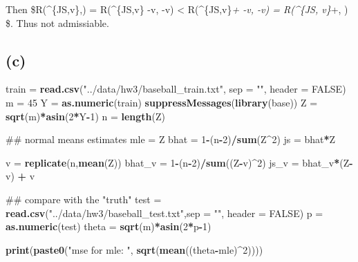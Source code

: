 \documentclass[]{article}
\newenvironment{Shaded}{\begin{snugshade}}{\end{snugshade}}
\newcommand{\KeywordTok}[1]{\textcolor[rgb]{0.13,0.29,0.53}{\textbf{#1}}}
\newcommand{\DataTypeTok}[1]{\textcolor[rgb]{0.13,0.29,0.53}{#1}}
\newcommand{\DecValTok}[1]{\textcolor[rgb]{0.00,0.00,0.81}{#1}}
\newcommand{\StringTok}[1]{\textcolor[rgb]{0.31,0.60,0.02}{#1}}
\newcommand{\OtherTok}[1]{\textcolor[rgb]{0.56,0.35,0.01}{#1}}
\newcommand{\OperatorTok}[1]{\textcolor[rgb]{0.81,0.36,0.00}{\textbf{#1}}}
\newcommand{\NormalTok}[1]{#1}
\begin{document}
Then \$R(\widehat{\theta}\^{}\{JS,v\},\theta) =
R(\widehat{\theta}\^{}\{JS,v\} -v, \theta-v) \textless{}
R(\widehat{\theta}\^{}\{JS,v\}\emph{+ -v, \theta-v) =
R(\widehat{\theta}\^{}\{JS, v\}}+, \theta) \$. Thus not admissiable.

\subsection{(c)}\label{c-1}

\begin{Shaded}
\begin{Highlighting}[]
\NormalTok{train =}\StringTok{ }\KeywordTok{read.csv}\NormalTok{(}\StringTok{"../data/hw3/baseball_train.txt"}\NormalTok{, }\DataTypeTok{sep =} \StringTok{""}\NormalTok{, }\DataTypeTok{header =} \OtherTok{FALSE}\NormalTok{)}
\NormalTok{m =}\StringTok{ }\DecValTok{45}
\NormalTok{Y =}\StringTok{ }\KeywordTok{as.numeric}\NormalTok{(train)}
\KeywordTok{suppressMessages}\NormalTok{(}\KeywordTok{library}\NormalTok{(base))}
\NormalTok{Z =}\StringTok{ }\KeywordTok{sqrt}\NormalTok{(m)}\OperatorTok{*}\KeywordTok{asin}\NormalTok{(}\DecValTok{2}\OperatorTok{*}\NormalTok{Y}\OperatorTok{-}\DecValTok{1}\NormalTok{)}
\NormalTok{n =}\StringTok{ }\KeywordTok{length}\NormalTok{(Z)}

\NormalTok{## normal means estimates}
\NormalTok{mle =}\StringTok{ }\NormalTok{Z}
\NormalTok{bhat =}\StringTok{ }\DecValTok{1}\OperatorTok{-}\NormalTok{(n}\OperatorTok{-}\DecValTok{2}\NormalTok{)}\OperatorTok{/}\KeywordTok{sum}\NormalTok{(Z}\OperatorTok{^}\DecValTok{2}\NormalTok{)}
\NormalTok{js =}\StringTok{ }\NormalTok{bhat}\OperatorTok{*}\NormalTok{Z}

\NormalTok{v =}\StringTok{ }\KeywordTok{replicate}\NormalTok{(n,}\KeywordTok{mean}\NormalTok{(Z))}
\NormalTok{bhat_v =}\StringTok{ }\DecValTok{1}\OperatorTok{-}\NormalTok{(n}\OperatorTok{-}\DecValTok{2}\NormalTok{)}\OperatorTok{/}\KeywordTok{sum}\NormalTok{((Z}\OperatorTok{-}\NormalTok{v)}\OperatorTok{^}\DecValTok{2}\NormalTok{)}
\NormalTok{js_v =}\StringTok{ }\NormalTok{bhat_v}\OperatorTok{*}\NormalTok{(Z}\OperatorTok{-}\NormalTok{v) }\OperatorTok{+}\StringTok{ }\NormalTok{v}

\NormalTok{## compare with the "truth"}
\NormalTok{test =}\StringTok{ }\KeywordTok{read.csv}\NormalTok{(}\StringTok{"../data/hw3/baseball_test.txt"}\NormalTok{,}\DataTypeTok{sep =} \StringTok{""}\NormalTok{, }\DataTypeTok{header =} \OtherTok{FALSE}\NormalTok{)}
\NormalTok{p =}\StringTok{ }\KeywordTok{as.numeric}\NormalTok{(test)}
\NormalTok{theta =}\StringTok{ }\KeywordTok{sqrt}\NormalTok{(m)}\OperatorTok{*}\KeywordTok{asin}\NormalTok{(}\DecValTok{2}\OperatorTok{*}\NormalTok{p}\OperatorTok{-}\DecValTok{1}\NormalTok{)}

\KeywordTok{print}\NormalTok{(}\KeywordTok{paste0}\NormalTok{(}\StringTok{"mse for mle: "}\NormalTok{, }\KeywordTok{sqrt}\NormalTok{(}\KeywordTok{mean}\NormalTok{((theta}\OperatorTok{-}\NormalTok{mle)}\OperatorTok{^}\DecValTok{2}\NormalTok{))))}
\end{Highlighting}
\end{Shaded}
\end{document}
